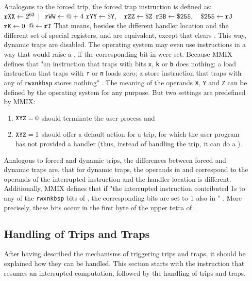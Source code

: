 Analogous to the forced trip, the forced trap instruction is defined as:
\instrtblsix
	{}
	{${\tt rXX} \leftarrow 2^{63}~|$~}
	{${\tt rWW} \leftarrow @ + 4$}
	{${\tt rYY} \leftarrow {\tt \$Y},\quad {\tt rZZ} \leftarrow {\tt \$Z}$}
	{${\tt rBB} \leftarrow {\tt \$255},\quad {\tt \$255} \leftarrow {\tt rJ}$}
	{${\tt rK} \leftarrow 0$}
	{$@ \leftarrow {\tt rT}$}
\noindent That means, besides the different handler location and the different set of special registers,  and  are equivalent, except that  clears . This way, dynamic traps are disabled. \citep[pg. 28]{mmix-doc} The operating system may even use instructions in a way that would raise a , if the corresponding bit in  were set. Because MMIX defines that "an instruction that traps with bits {\tt x}, {\tt k} or {\tt b} does nothing; a load instruction that traps with {\tt r} or {\tt n} loads zero; a store instruction that traps with any of {\tt rwxnkbsp} stores nothing" \citep[pg. 29]{mmix-doc}. The meaning of the operands {\tt X}, {\tt Y} and {\tt Z} can be defined by the operating system for any purpose. But two settings are predefined by MMIX:
\begin{enumerate}
	\item ${\tt XYZ} = 0$ should terminate the user process and
	\item ${\tt XYZ} = 1$ should offer a default action for a trip, for which the user program has not provided a handler (thus, instead of handling the trip, it can do a ).
\end{enumerate}

Analogous to forced and dynamic trips, the differences between forced and dynamic traps are, that for dynamic traps, the operands in  and  correspond to the operands of the interrupted instruction and the handler location is different. Additionally, MMIX defines that if "the interrupted instruction contributed 1s to any of the {\tt rwxnkbsp} bits of , the corresponding bits are set to 1 also in " \citep[pg. 29]{mmix-doc}. More precisely, these bits occur in the first byte of the upper tetra of .

\subsection{Handling of Trips and Traps}

After having described the mechanisms of triggering trips and traps, it should be explained how they can be handled. This section starts with the instruction that resumes an interrupted computation, followed by the handling of trips and traps.

